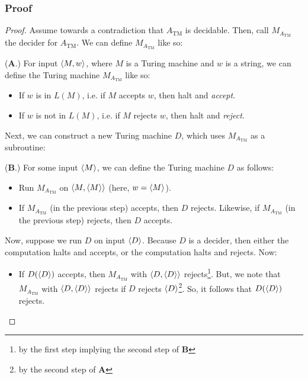 \documentclass[letterpaper]{article}
\begin{document}
\subsubsection{Proof}
\begin{mdframed}[]
    \begin{proof}
        Assume towards a contradiction that $A_{\text{TM}}$ is decidable. Then, call $M_{A_{\text{TM}}}$ the decider for $A_{\text{TM}}$. We can define $M_{A_{\text{TM}}}$ like so: 
        \begin{mdframed}[]
            (\textbf{A}.) For input $\langle M, w \rangle$, where $M$ is a Turing machine and $w$ is a string, we can define the Turing machine $M_{A_{\text{TM}}}$ like so:
            \begin{itemize}
                \item If $w$ is in $L(M)$, i.e. if $M$ accepts $w$, then halt and \emph{accept}.
                \item If $w$ is not in $L(M)$, i.e. if $M$ rejects $w$, then halt and \emph{reject}. 
            \end{itemize}
        \end{mdframed}
        Next, we can construct a new Turing machine $D$, which uses $M_{A_\text{TM}}$ as a subroutine: 
        \begin{mdframed}[]
            (\textbf{B}.) For some input $\langle M \rangle$, we can define the Turing machine $D$ as follows:
            \begin{itemize}
                \item Run $M_{A_{\text{TM}}}$ on $\langle M, \langle M \rangle \rangle$ (here, $w = \langle M \rangle$). 
                \item If $M_{A_{\text{TM}}}$ (in the previous step) accepts, then $D$ rejects. Likewise, if $M_{A_{\text{TM}}}$ (in the previous step) rejects, then $D$ accepts.
            \end{itemize}
        \end{mdframed}
        Now, suppose we run $D$ on input $\langle D \rangle$. Because $D$ is a decider, then either the computation halts and accepts, or the computation halts and rejects. Now: 
        \begin{itemize}
            \item If $D(\langle D \rangle)$ accepts, then $M_{A_{\text{TM}}}$ with $\langle D, \langle D \rangle \rangle$ rejects\footnote{by the first step implying the second step of \textbf{B}}. But, we note that $M_{A_{\text{TM}}}$ with $\langle D, \langle D \rangle \rangle$ rejects if $D$ rejects $\langle D \rangle$\footnote{by the second step of \textbf{A}}. So, it follows that $D(\langle D \rangle)$ rejects. 

\end{itemize}
\end{proof}
\end{mdframed}
\end{document}
